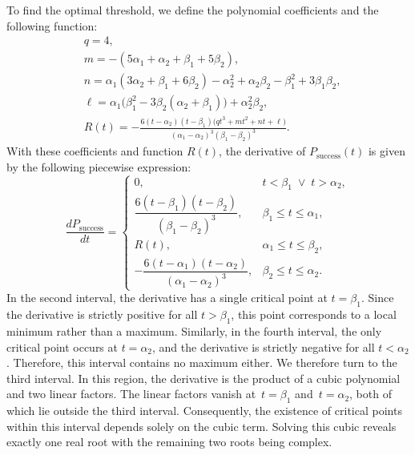 \documentclass[conference,compsoc]{IEEEtran}
\begin{document}
To find the optimal threshold, we define the polynomial coefficients and the following function:
\begin{align*}
&q = 4, \\
&m = -(5\alpha_1 + \alpha_2 + \beta_1 + 5\beta_2),\\ 
&n = \alpha_1(3\alpha_2 + \beta_1 + 6\beta_2)
    - \alpha_2^2 + \alpha_2\beta_2 - \beta_1^2 + 3\beta_1\beta_2,\\
&\ell = \alpha_1\bigl(\beta_1^2 - 3\beta_2(\alpha_2 + \beta_1)\bigr)
       + \alpha_2^2 \beta_2,\\
&R(t) = -\frac{6 (t-\alpha_2)(t-\beta_1)\bigl(qt^3 + mt^2 + nt + \ell\bigr)}
     {(\alpha_1-\alpha_2)^3 (\beta_1-\beta_2)^3}.
\end{align*}
With these coefficients and function $R(t)$, the derivative of $P_{\text{success}}(t)$ is given by the following piecewise expression:
\begin{equation*}
\frac{dP_{\text{success}}}{dt} =
\begin{cases}
0, & t < \beta_1 \;\lor\; t > \alpha_2, \\

\dfrac{6 (t-\beta_1) (t-\beta_2)}{(\beta_1-\beta_2)^3},
& \beta_1 \le t \le \alpha_1, \\

R(t),
& \alpha_1 \le t \le \beta_2, \\

-\dfrac{6 (t-\alpha_1) (t-\alpha_2)}{(\alpha_1-\alpha_2)^3},
& \beta_2 \le t \le \alpha_2.
\end{cases}
\end{equation*}
In the second interval, the derivative has a single critical point at $t=\beta_{1}$. Since the derivative is strictly positive for all $t>\beta_{1}$, this point corresponds to a local minimum rather than a maximum. Similarly, in the fourth interval, the only critical point occurs at $t=\alpha_{2}$, and the derivative is strictly negative for all $t<\alpha_{2}$. Therefore, this interval contains no maximum either. We therefore turn to the third interval. In this region, the derivative is the product of a cubic polynomial and two linear factors. The linear factors vanish at~$t=\beta_{1}$ and~$t=\alpha_{2}$, both of which lie outside the third interval. Consequently, the existence of critical points within this interval depends solely on the cubic term. Solving this cubic reveals exactly one real root with the remaining two roots being complex.
\end{document}
